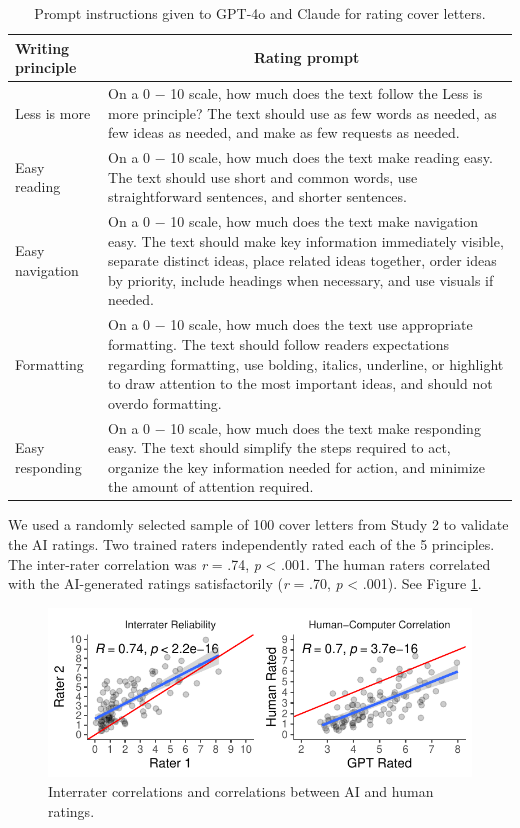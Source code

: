 \documentclass[11pt]{report}
\begin{document}
\begin{append}
\begin{table}[h]
    \centering
    \footnotesize
    \caption{Prompt instructions given to GPT-4o and Claude for rating cover letters.}
    \label{tab:prompts}
    \begin{tabular}{lp{15cm}}
    \toprule
    \textbf{Writing principle} & \multicolumn{1}{c}{\textbf{Rating prompt}}\\
    \midrule
        Less is more	& On a 0 $-$ 10 scale, how much does the text follow the Less is more principle? The text should use as few words as needed, as few ideas as needed, and make as few requests as needed. \\
        Easy reading	& On a 0 $-$ 10 scale, how much does the text make reading easy. The text should use short and common words, use straightforward sentences, and shorter sentences.\\
        Easy navigation	& On a 0 $-$ 10 scale, how much does the text make navigation easy. The text should make key information immediately visible, separate distinct ideas, place related ideas together, order ideas by priority, include headings when necessary, and use visuals if needed.\\
        Formatting	& On a 0 $-$ 10 scale, how much does the text use appropriate formatting. The text should follow readers expectations regarding formatting, use bolding, italics, underline, or highlight to draw attention to the most important ideas, and should not overdo formatting.\\
        Easy responding &	On a 0 $-$ 10 scale, how much does the text make responding easy. The text should simplify the steps required to act, organize the key information needed for action, and minimize the amount of attention required.  \\ \bottomrule
    \end{tabular}


    
\end{table}

We used a randomly selected sample of 100 cover letters from Study 2 to validate the AI ratings. Two trained raters independently rated each of the 5 principles. The inter-rater correlation was \textit{r} = .74, \textit{p} < .001. The human raters correlated with the AI-generated ratings satisfactorily (\textit{r} = .70, \textit{p} < .001).     See Figure \ref{fig:ai_valid}.

\begin{figure}[h]
    \centering
    \includegraphics[width=0.75\linewidth]{ai_validity.pdf}
    \caption{Interrater correlations and correlations between AI and human ratings.}
    \label{fig:ai_valid}
\end{figure}


\end{append}
\end{document}
